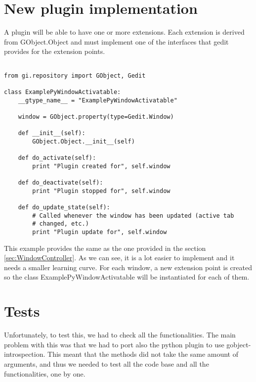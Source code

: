 \section{New plugin implementation}

A plugin will be able to have one or more extensions. Each extension is derived from GObject.Object and must implement one of the interfaces that gedit provides for the extension points.

\begin{lstlisting}[style=python]

from gi.repository import GObject, Gedit

class ExamplePyWindowActivatable:
    __gtype_name__ = "ExamplePyWindowActivatable"

    window = GObject.property(type=Gedit.Window)

    def __init__(self):
        GObject.Object.__init__(self)

    def do_activate(self):
        print "Plugin created for", self.window

    def do_deactivate(self):
        print "Plugin stopped for", self.window

    def do_update_state(self):
        # Called whenever the window has been updated (active tab
        # changed, etc.)
        print "Plugin update for", self.window

\end{lstlisting}

This example provides the same as the one provided in the section \ref{sec:WindowController}. As we can see, it is a lot easier to implement and it needs a smaller learning curve. For each window, a new extension point is created so the class ExamplePyWindowActivatable will be instantiated for each of them.

\section{Tests}

Unfortunately, to test this, we had to check all the functionalities. The main problem with this was that we had to port also the python plugin to use gobject-introspection. This meant that the methods did not take the same amount of arguments, and thus we needed to test all the code base and all the functionalities, one by one.

